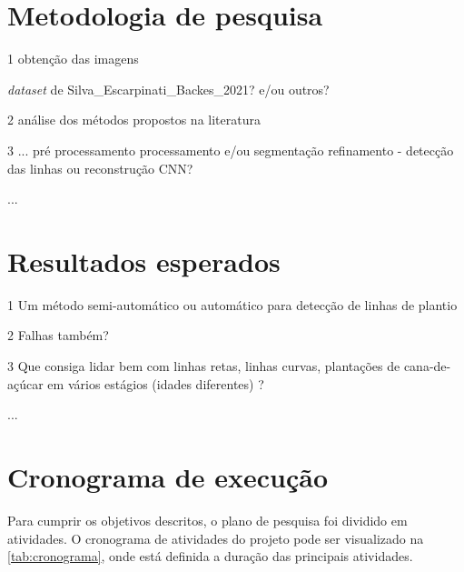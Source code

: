 \documentclass[12pt, a4paper, english, brazil]{article}
\newcommand{\textBlue}[1]{{{\color{blue} #1}}}
\begin{document}
\section{Metodologia de pesquisa}

\textBlue{
1 obtenção das imagens

    \textit{dataset} de Silva\_Escarpinati\_Backes\_2021? e/ou outros?

2 análise dos métodos propostos na literatura

3 ...
    pré processamento
    processamento e/ou segmentação
    refinamento - detecção das linhas ou reconstrução
    CNN?

...
}

\section{Resultados esperados}

\textBlue{
1 Um método semi-automático ou automático para detecção de linhas de plantio

2 Falhas também?

3 Que consiga lidar bem com linhas retas, linhas curvas, plantações de cana-de-açúcar em vários estágios (idades diferentes) ?

...
}


\section{Cronograma de execução}

Para cumprir os objetivos descritos, o plano de pesquisa foi dividido em atividades. O cronograma de atividades do projeto pode ser visualizado na \autoref{tab:cronograma}, onde está definida a
duração das principais atividades.
\end{document}
